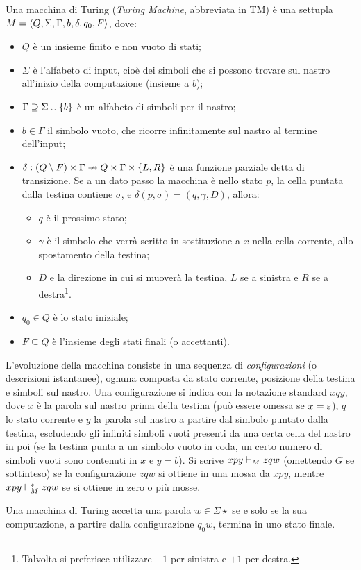 \begin{defin}
	Una macchina di Turing (\emph{Turing Machine}, abbreviata in TM) è una settupla $M=\langle Q,\Sigma,\Gamma,b,\delta,q_0,F \rangle$, dove:
	\begin{itemize}
		\item $Q$ è un insieme finito e non vuoto di stati;
		\item $\Sigma$ è l'alfabeto di input, cioè dei simboli che si possono trovare sul nastro all'inizio della computazione (insieme a $b$);
		\item $\Gamma\supseteq\Sigma\cup\left\{ b \right\}$ è un alfabeto di simboli per il nastro;
		\item $b\in\Gamma$ il simbolo vuoto, che ricorre infinitamente sul nastro al termine dell'input;
		\item $\delta:(Q\setminus F)\times\Gamma\nrightarrow Q\times\Gamma\times\left\{ L,R \right\}$ è una funzione parziale detta di transizione. Se a un dato passo la macchina è nello stato $p$, la cella puntata dalla testina contiene $\sigma$, e $\delta(p,\sigma)=(q,\gamma,D)$, allora:
		      \begin{itemize}
			      \item $q$ è il prossimo stato;
			      \item $\gamma$ è il simbolo che verrà scritto in sostituzione a $x$ nella cella corrente, allo spostamento della testina;
			      \item $D$ e la direzione in cui si muoverà la testina, $L$ se a sinistra e $R$ se a destra\footnote{Talvolta si preferisce utilizzare $-1$ per sinistra e $+1$ per destra.}.
		      \end{itemize}
		\item $q_0\in Q$ è lo stato iniziale;
		\item $F\subseteq Q$ è l'insieme degli stati finali (o accettanti).
	\end{itemize}
	L'evoluzione della macchina consiste in una sequenza di \emph{configurazioni} (o descrizioni istantanee), ognuna composta da stato corrente, posizione della testina e simboli sul nastro. Una configurazione si indica con la notazione standard $xqy$, dove $x$ è la parola sul nastro prima della testina (può essere omessa se $x=\varepsilon$), $q$ lo stato corrente e $y$ la parola sul nastro a partire dal simbolo puntato dalla testina, escludendo gli infiniti simboli vuoti presenti da una certa cella del nastro in poi (se la testina punta a un simbolo vuoto in coda, un certo numero di simboli vuoti sono contenuti in $x$ e $y=b$). Si scrive $xpy\vdash_{M} zqw$ (omettendo $G$ se sottinteso) se la configurazione $zqw$ si ottiene in una mossa da $xpy$, mentre $xpy\vdash_{M}^* zqw$ se si ottiene in zero o più mosse.

	Una macchina di Turing accetta una parola $w\in\Sigma\star$ se e solo se la sua computazione, a partire dalla configurazione $q_0w$, termina in uno stato finale.
\end{defin}

